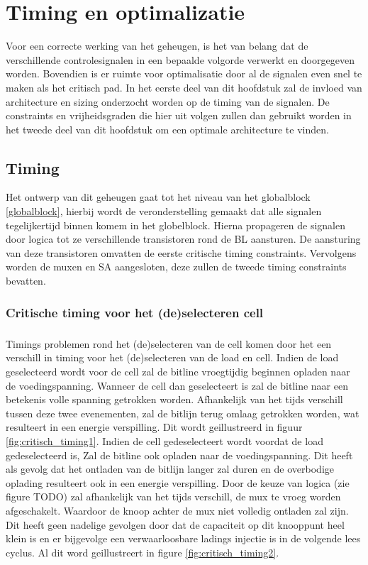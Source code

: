 \chapter{Timing en optimalizatie}
\label{timing-optimization}
Voor een correcte werking van het geheugen, is het van belang dat de verschillende controlesignalen in een bepaalde volgorde verwerkt en doorgegeven worden.
Bovendien is er ruimte voor optimalisatie door al de signalen even snel te maken als het critisch pad. In het eerste deel van dit hoofdstuk zal de invloed van architecture en sizing onderzocht worden op de timing van de signalen. De constraints en vrijheidsgraden die hier uit volgen zullen dan gebruikt worden in het tweede deel van dit hoofdstuk om een optimale architecture te vinden.

\section{Timing}
\label{timing}
Het ontwerp van dit geheugen gaat tot het niveau van het globalblock \ref{globalblock}, hierbij wordt de veronderstelling gemaakt dat alle signalen tegelijkertijd binnen komem in het globelblock. Hierna propageren de signalen door logica tot ze verschillende transistoren rond de BL aansturen. De aansturing van deze transistoren omvatten de eerste critische timing constraints. Vervolgens worden de muxen en SA aangesloten, deze zullen de tweede timing constraints bevatten.

\subsection{Critische timing voor het (de)selecteren cell}
\paragraph{}
Timings problemen rond het (de)selecteren van de cell komen door het een verschill in timing voor het (de)selecteren van de load en cell. Indien de load geselecteerd wordt voor de cell zal de bitline vroegtijdig beginnen opladen naar de voedingspanning. Wanneer de cell dan geselecteert is zal de bitline naar een betekenis volle spanning getrokken worden. Afhankelijk van het tijds verschill tussen deze twee evenementen, zal de bitlijn terug omlaag getrokken worden, wat resulteert in een energie verspilling. Dit wordt geillustreerd in figuur \ref{fig:critisch_timing1}. Indien de cell gedeselecteert wordt voordat de load gedeselecteerd is, Zal de bitline ook opladen naar de voedingspanning. Dit heeft als gevolg dat het ontladen van de bitlijn langer zal duren en de overbodige oplading resulteert ook in een energie verspilling. Door de keuze van logica (zie figure TODO) zal afhankelijk van het tijds verschill, de mux te vroeg worden afgeschakelt. Waardoor de knoop achter de mux niet volledig ontladen zal zijn. Dit heeft geen nadelige gevolgen door dat de capaciteit op dit knooppunt heel klein is en er bijgevolge een verwaarloosbare ladings injectie is in de volgende lees cyclus. Al dit word geillustreert in figure \ref{fig:critisch_timing2}.  


